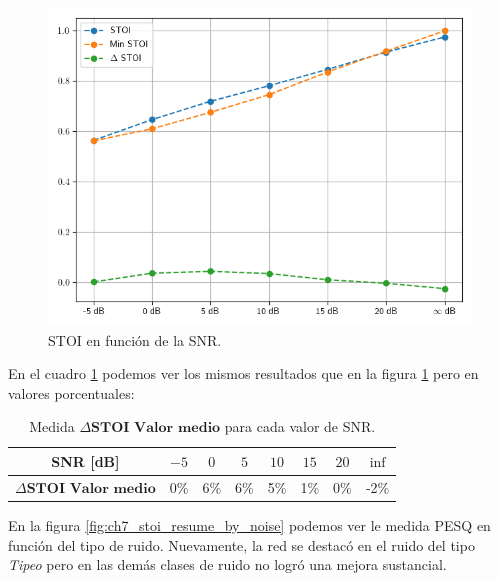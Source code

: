\begin{figure}
	\centering
	\centerline{\includegraphics[scale=0.70]{images/ch7/objective_metrics/metric_STOI.png}}
	\caption{STOI en función de la SNR.}
	\label{fig:ch7_stoi_resume}
\end{figure}

En el cuadro \ref{table:neural_filter_stoi_resume} podemos ver los mismos resultados que en la figura \ref{fig:ch7_stoi_resume} pero en valores porcentuales:

\begin{table}[ht]
	\centering
	\begin{tabular}{ |c|c|c|c|c|c|c|c| } 
		\hline
		SNR [dB] & $-5$ & $0$ & $5$ & $10$ & $15$ & $20$ & $\inf$ \\ 
		\hline
		$\Delta \textbf{STOI Valor medio}$ & 0\%  & 6\%  & 6\% & 5\% & 1\% & 0\% & -2\% \\
		\hline
	\end{tabular}
	\caption{Medida $\Delta \textbf{STOI Valor medio}$ para cada valor de SNR.}
	\label{table:neural_filter_stoi_resume}
\end{table}

En la figura \ref{fig:ch7_stoi_resume_by_noise} podemos ver le medida PESQ en función del tipo de ruido. Nuevamente, la red se destacó en el ruido del tipo \emph{Tipeo} pero en las demás clases de ruido no logró una mejora sustancial.

